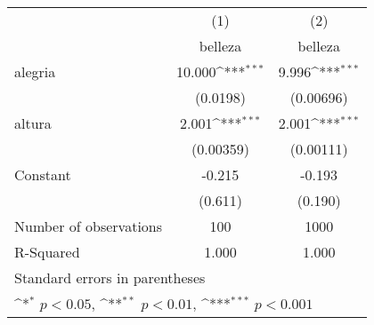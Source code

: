 {
\def\sym#1{\ifmmode^{#1}\else\(^{#1}\)\fi}
\begin{tabular}{l*{2}{c}}
\hline\hline
                    &\multicolumn{1}{c}{(1)}&\multicolumn{1}{c}{(2)}\\
                    &\multicolumn{1}{c}{belleza}&\multicolumn{1}{c}{belleza}\\
\hline
alegria             &      10.000\sym{***}&       9.996\sym{***}\\
                    &    (0.0198)         &   (0.00696)         \\
[1em]
altura              &       2.001\sym{***}&       2.001\sym{***}\\
                    &   (0.00359)         &   (0.00111)         \\
[1em]
Constant            &      -0.215         &      -0.193         \\
                    &     (0.611)         &     (0.190)         \\
\hline
Number of observations&         100         &        1000         \\
R-Squared           &       1.000         &       1.000         \\
\hline\hline
\multicolumn{3}{l}{\footnotesize Standard errors in parentheses}\\
\multicolumn{3}{l}{\footnotesize \sym{*} \(p<0.05\), \sym{**} \(p<0.01\), \sym{***} \(p<0.001\)}\\
\end{tabular}
}
